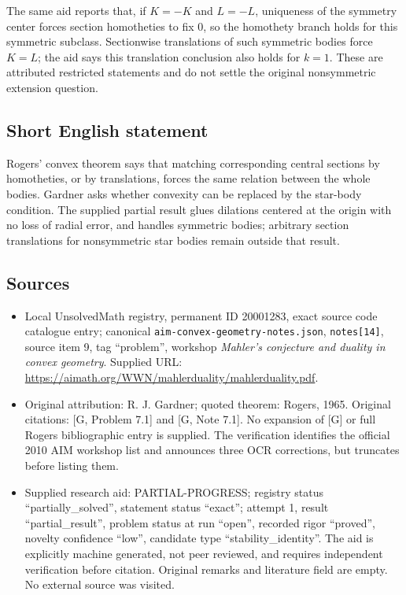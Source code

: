 \documentclass[11pt]{article}
\begin{document}
The same aid reports that, if $K=-K$ and $L=-L$, uniqueness of the symmetry center forces section homotheties to fix $0$, so the homothety branch holds for this symmetric subclass. Sectionwise translations of such symmetric bodies force $K=L$; the aid says this translation conclusion also holds for $k=1$. These are attributed restricted statements and do not settle the original nonsymmetric extension question.
\subsection{Short English statement}
Rogers' convex theorem says that matching corresponding central sections by homotheties, or by translations, forces the same relation between the whole bodies. Gardner asks whether convexity can be replaced by the star-body condition. The supplied partial result glues dilations centered at the origin with no loss of radial error, and handles symmetric bodies; arbitrary section translations for nonsymmetric star bodies remain outside that result.
\subsection{Sources}
\begin{itemize}
\item Local UnsolvedMath registry, permanent ID 20001283, exact source code catalogue entry; canonical \texttt{aim-convex-geometry-notes.json}, \texttt{notes[14]}, source item 9, tag ``problem'', workshop \emph{Mahler's conjecture and duality in convex geometry}. Supplied URL: \url{https://aimath.org/WWN/mahlerduality/mahlerduality.pdf}.
\item Original attribution: R. J. Gardner; quoted theorem: Rogers, 1965. Original citations: [G, Problem 7.1] and [G, Note 7.1]. No expansion of [G] or full Rogers bibliographic entry is supplied. The verification identifies the official 2010 AIM workshop list and announces three OCR corrections, but truncates before listing them.
\item Supplied research aid: PARTIAL-PROGRESS; registry status ``partially\_solved'', statement status ``exact''; attempt 1, result ``partial\_result'', problem status at run ``open'', recorded rigor ``proved'', novelty confidence ``low'', candidate type ``stability\_identity''. The aid is explicitly machine generated, not peer reviewed, and requires independent verification before citation. Original remarks and literature field are empty. No external source was visited.
\end{itemize}
\end{document}
